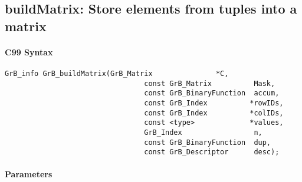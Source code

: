 \subsection{{\sf buildMatrix}: Store elements from tuples into a matrix}
\label{Sec:buildMatrix}

\paragraph{C99 Syntax}

\begin{Verbatim}[samepage=true]    
        GrB_info GrB_buildMatrix(GrB_Matrix               *C,
                                 const GrB_Matrix          Mask,
                                 const GrB_BinaryFunction  accum,
                                 const GrB_Index          *rowIDs,
                                 const GrB_Index          *colIDs, 
                                 const <type>             *values,
                                 GrB_Index                 n,
                                 const GrB_BinaryFunction  dup,
                                 const GrB_Descriptor      desc);
\end{Verbatim}

\paragraph{Parameters}

